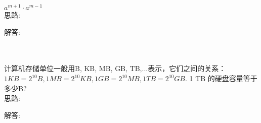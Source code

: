 \item {
    $ a^{m+1}\cdot a^{m-1}$
    \ifshowSolution
        \fangsong{}
        \\
        思路:

        解答: 
    \else
        \\ \\ \\
    \fi
}

\item {
    计算机存储单位一般用B, KB, MB, GB, TB,...表示，它们之间的关系：$1 KB = 2^{10} B, 1 MB = 2^{10} KB, 1 GB = 2^{10} MB, 1 TB = 2^{10} GB.$ 1 TB 的硬盘容量等于多少B?
    \ifshowSolution
        \fangsong{}
        \\
        思路:

        解答: 
    \else
        \\ \\ \\
    \fi
}